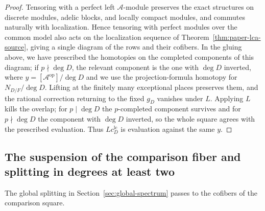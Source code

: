 \begin{proof}
Tensoring with a perfect left $\mathcal A$-module preserves the exact structures on discrete modules, adelic blocks, and locally compact modules, and commutes naturally with localization.
Hence tensoring with perfect modules over the common model also acts on the localization sequence of Theorem~\ref{thm:paper-lca-source}, giving a single diagram of the rows and their cofibers.
In the gluing above, we have prescribed the homotopies on the completed components of this diagram; if $p\nmid\deg D$, the relevant component is the one with $\deg D$ inverted, where $y=[\mathcal A^{\mathrm{op}}]/\deg D$ and we use the projection-formula homotopy for $N_{D/F}/\deg D$.
Lifting at the finitely many exceptional places preserves them, and the rational correction returning to the fixed $g_D$ vanishes under $L$.
Applying $L$ kills the overlap; for $p\mid\deg D$ the $p$-completed component survives and for $p\nmid\deg D$ the component with $\deg D$ inverted, so the whole square agrees with the prescribed evaluation.
Thus $Lc^{\mathrm{lc}}_D$ is evaluation against the same $y$.
\end{proof}

\subsection{The suspension of the comparison fiber and splitting in degrees at least two}
\label{subsec:paper-lca-fiber}
The global splitting in Section~\ref{sec:global-spectrum} passes to the cofibers of the comparison square.

